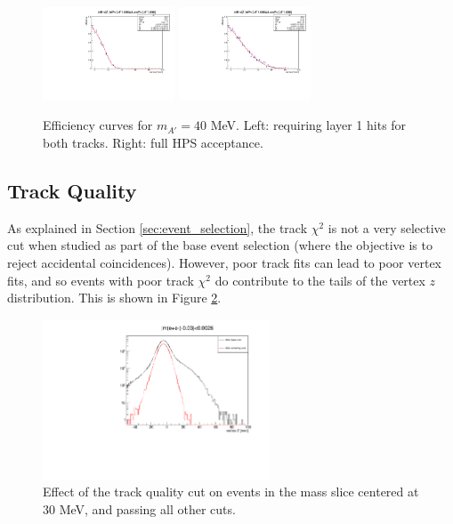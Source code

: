\begin{figure}[ht]
\begin{center}
    \includegraphics[width=0.35\textwidth,page=7,angle=-90]{vertexing/figs/acceptance_data}
    \includegraphics[width=0.35\textwidth,page=7,angle=-90]{vertexing/figs/acceptance_alllayers_data}
\end{center}
\caption{Efficiency curves for $m_{A'}=40$ MeV. Left: requiring layer 1 hits for both tracks. Right: full HPS acceptance.}
    \label{fig:eff_z_alllayers}
\end{figure}

\subsection{Track Quality}
As explained in Section \ref{sec:event_selection}, the track $\chi^2$ is not a very selective cut when studied as part of the base event selection (where the objective is to reject accidental coincidences).
However, poor track fits can lead to poor vertex fits, and so events with poor track $\chi^2$ do contribute to the tails of the vertex $z$ distribution.
This is shown in Figure \ref{fig:trkchisq_performance}.

\begin{figure}[ht]
\begin{center}
    \includegraphics[width=0.6\textwidth,page=3,angle=-90]{vertexing/figs/vertcutplots}
\end{center}
    \caption{Effect of the track quality cut on events in the mass slice centered at 30 MeV, and passing all other cuts.
    }
    \label{fig:trkchisq_performance}
\end{figure}

